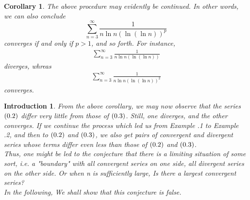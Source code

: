 \documentclass[12pt]{article}
\theoremstyle{oneline}
\newtheorem{corollary}{Corollary}[subsection]
\theoremstyle{twoline}
\newtheorem{introduction}{Introduction}
\begin{document}
\begin{corollary}
  The above procedure may evidently be continued. In other words, we can also conclude 
  \[\sum\limits_{n=3}^\infty\frac1{n\ln n(\ln(\ln n))^p}\] converges if and only if $p>1$, and so forth. For instance,
  \begin{align}
    \sum\limits_{n=3}^\infty\frac1{n\ln n(\ln(\ln n))} 
  \end{align}
  diverges, whreas
  \begin{align}
    \sum\limits_{n=3}^\infty\frac1{n\ln n(\ln(\ln n))^2}
  \end{align}
  converges.
\end{corollary}

\begin{introduction}
  \hspace*{2em}
  From the above corollary, we may now observe that the series $(\thesection.2)$ differ very little from those of $(\thesection.3)$. Still, one diverges, and the other converges. If we continue the process which led us from \textit{Example \thesubsection.1} to \textit{Example \thesubsection.2}, and then to $(\thesection.2)$ and $(\thesection.3)$, we also get pairs of convergent and divergent series whose terms differ even less than those of $(\thesection.2)$ and $(\thesection.3)$.\\
  \hspace*{2em}
  Thus, one might be led to the conjecture that there is a limiting situation of some sort, i.e. a "boundary" with all convergent series on one side, all divergent series on the other side.
  Or when n is sufficiently large, Is there a largest convergent series?\\
  \hspace*{2em}
  In the following, We shall show that this conjecture is false.
\end{introduction}
\end{document}
